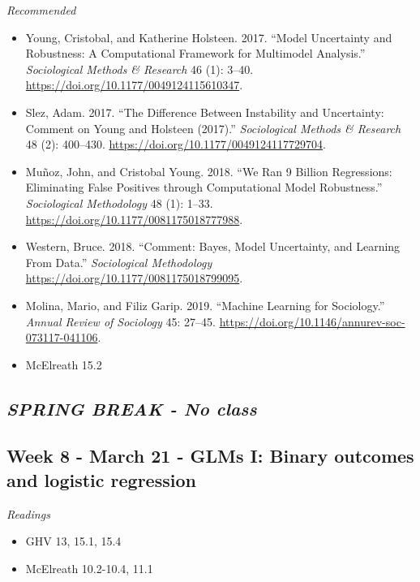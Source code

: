 \documentclass[
  10pt,
]{article}
\providecommand{\tightlist}{%
  \setlength{\itemsep}{0pt}\setlength{\parskip}{0pt}}
\begin{document}
\emph{Recommended}

\begin{itemize}
\tightlist
\item
  Young, Cristobal, and Katherine Holsteen. 2017. ``Model Uncertainty
  and Robustness: A Computational Framework for Multimodel Analysis.''
  \emph{Sociological Methods \& Research} 46 (1): 3--40.
  \url{https://doi.org/10.1177/0049124115610347}.
\item
  Slez, Adam. 2017. ``The Difference Between Instability and
  Uncertainty: Comment on Young and Holsteen (2017).''
  \emph{Sociological Methods \& Research} 48 (2): 400--430.
  \url{https://doi.org/10.1177/0049124117729704}.
\item
  Muñoz, John, and Cristobal Young. 2018. ``We Ran 9 Billion
  Regressions: Eliminating False Positives through Computational Model
  Robustness.'' \emph{Sociological Methodology} 48 (1): 1--33.
  \url{https://doi.org/10.1177/0081175018777988}.
\item
  Western, Bruce. 2018. ``Comment: Bayes, Model Uncertainty, and
  Learning From Data.'' \emph{Sociological Methodology}
  \url{https://doi.org/10.1177/0081175018799095}.
\item
  Molina, Mario, and Filiz Garip. 2019. ``Machine Learning for
  Sociology.'' \emph{Annual Review of Sociology} 45: 27--45.
  \url{https://doi.org/10.1146/annurev-soc-073117-041106}.
\item
  McElreath 15.2
\end{itemize}

\hypertarget{spring-break---no-class}{%
\subsection{\texorpdfstring{\emph{SPRING BREAK - No
class}}{SPRING BREAK - No class}}\label{spring-break---no-class}}

\hypertarget{week-8---march-21---glms-i-binary-outcomes-and-logistic-regression}{%
\subsection{Week 8 - March 21 - GLMs I: Binary outcomes and logistic
regression}\label{week-8---march-21---glms-i-binary-outcomes-and-logistic-regression}}

\emph{Readings}

\begin{itemize}
\tightlist
\item
  GHV 13, 15.1, 15.4
\item
  McElreath 10.2-10.4, 11.1
\end{itemize}
\end{document}
